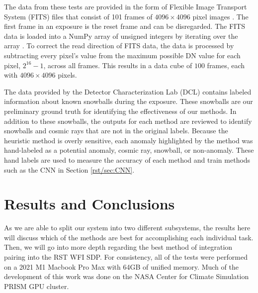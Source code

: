 The data from these tests are provided in the form of Flexible Image Transport System (FITS) files that consist of 101 frames of $4096 \times 4096$ pixel images \parencite{wells1979fits}.
The first frame in an exposure is the reset frame and can be disregarded. 
The FITS data is loaded into a NumPy array of unsigned integers by iterating over the array \parencite{harris2020array}.
To correct the read direction of FITS data, the data is processed by subtracting every pixel's value from the maximum possible DN value for each pixel, $2^{16} - 1$, across all frames.
This results in a data cube of $100$ frames, each with $4096 \times 4096$ pixels. 

The data provided by the Detector Characterization Lab (DCL) contains labeled information about known snowballs during the exposure. 
These snowballs are our preliminary ground truth for identifying the effectiveness of our methods. 
In addition to these snowballs, the outputs for each method are reviewed to identify snowballs and cosmic rays that are not in the original labels.
Because the heuristic method is overly sensitive, each anomaly highlighted by the method was hand-labeled as a potential anomaly, cosmic ray, snowball, or non-anomaly. 
These hand labels are used to measure the accuracy of each method and train methods such as the CNN in Section \ref{rst/sec:CNN}.

\section{Results and Conclusions}
\label{rst/sec:results}

As we are able to split our system into two different subsystems, the results here will discuss which of the methods are best for accomplishing each individual task. 
Then, we will go into more depth regarding the best method of integration pairing into the RST WFI SDP. 
For consistency, all of the tests were performed on a 2021 M1 Macbook Pro Max with 64GB of unified memory.
Much of the development of this work was done on the NASA Center for Climate Simulation PRISM GPU cluster. 

